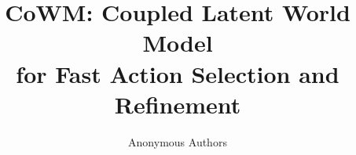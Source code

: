 \documentclass[10pt,twocolumn,letterpaper]{article}
\title{CoWM: Coupled Latent World Model\\for Fast Action Selection and Refinement}
\author{Anonymous Authors}
\begin{document}
\maketitle






{
    \small
    
    
}

% 
% 
\end{document}
